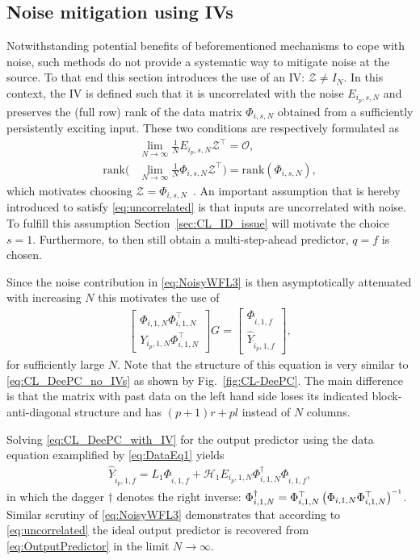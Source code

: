 \subsection{Noise mitigation using \acl{IVs}}
Notwithstanding potential benefits of beforementioned mechanisms to cope with noise, such methods do not provide a systematic way to mitigate noise at the source. To that end this section introduces the use of an \ac{IV}: $\mathcal{Z}\neq I_N$. In this context, the \ac{IV} is defined such that it is uncorrelated with the noise $E_{i_p,s,N}$ and preserves the (full row) rank of the data matrix $\Phi_{i,s,N}$ obtained from a sufficiently persistently exciting input. These two conditions are respectively formulated as
%
\begin{align}
    &\lim_{N\rightarrow\infty} \frac{1}{N}E_{i_p,s,N}\mathcal{Z}^\top = \mathcal{O},\label{eq:uncorrelated}\\
    \text{rank}\biggl(&\lim_{N\rightarrow\infty} \frac{1}{N}\Phi_{i,s,N}\mathcal{Z}^\top\biggl) =  \text{rank}(\Phi_{i,s,N}),\label{eq:rankconservation}
\end{align}
%
which motivates choosing $\mathcal{Z}=\Phi_{i,s,N}$~\cite[Chapt. 9.6]{Verhaegen2007a}. An important assumption that is hereby introduced to satisfy \eqref{eq:uncorrelated} is that inputs are uncorrelated with noise. To fulfill this assumption Section~\ref{sec:CL_ID_issue} will motivate the choice $s=1$. Furthermore, to then still obtain a multi-step-ahead predictor, $q=f$ is chosen.

Since the noise contribution in \eqref{eq:NoisyWFL3} is then asymptotically attenuated with increasing $N$ this motivates the use of
\begin{align}\label{eq:CL_DeePC_with_IV}
    \begin{bmatrix}
   \Phi_{i,1,N}\Phi_{i,1,N}^\top\\
   \hline
   Y_{i_p,1,N}\Phi_{i,1,N}^\top
    \end{bmatrix}
G =
\begin{bmatrix}
    \Phi_{\hat{i},1,f}\\
    \hline
    \widehat{Y}_{\hat{i}_p,1,f}
\end{bmatrix},
\end{align}
for sufficiently large $N$. Note that the structure of this equation is very similar to \eqref{eq:CL_DeePC_no_IVs} as shown by Fig.~\ref{fig:CL-DeePC}. The main difference is that the matrix with past data on the left hand side loses its indicated block-anti-diagonal structure and has $(p+1)r+pl$ instead of $N$ columns.

Solving \eqref{eq:CL_DeePC_with_IV} for the output predictor using the data equation examplified by \eqref{eq:DataEq1} yields
\begin{align}\label{eq:OutputPredictor}
    \widehat{Y}_{\hat{i}_p,1,f} = L_1 \Phi_{\hat{i},1,f} + \mathcal{H}_1 E_{i_p,1,N}\Phi_{i,1,N}^\dagger\Phi_{\hat{i},1,f},
\end{align}
in which the dagger $\dagger$ denotes the right inverse: ${\Phi_{i,1,N}^\dagger=\Phi_{i,1,N}^\top\left(\Phi_{i,1,N}\Phi_{i,1,N}^\top\right)\inv}$. Similar scrutiny of \eqref{eq:NoisyWFL3} demonstrates that according to \eqref{eq:uncorrelated} the ideal output predictor is recovered from \eqref{eq:OutputPredictor} in the limit $N\rightarrow\infty$.
